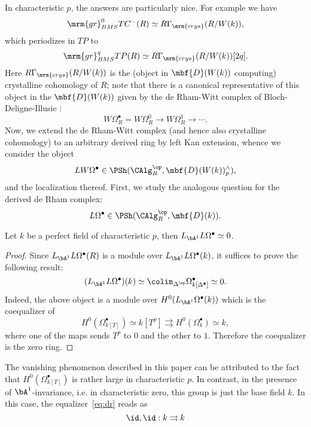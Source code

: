 \documentclass[a4paper,10pt]{amsart}
\begin{document}
\sssec{} In characteristic $p$, the answers are particularly nice. For example we have \cite[Theorems 1.10, 1.12]{BMS2}
\[
\mrm{gr}^0_{BMS}TC^-(R) \simeq R\Gamma_{\mrm{crys}}(R/W(k)),
\]
which periodizes in $TP$ to
\begin{equation} \label{eq:tp-gr}
\mrm{gr}^q_{BMS}TP(R) \simeq R\Gamma_{\mrm{crys}}(R/W(k))[2q].
\end{equation}
Here $R\Gamma_{\mrm{crys}}(R/W(k))$ is the (object in $\mbf{D}(W(k))$ computing) crystalline cohomology of $R$; note that there is a canonical representative of this object in the $\mbf{D}(W(k))$ given by the de Rham-Witt complex of Bloch-Deligne-Illusie \cite{illusie-drw}:
\[
W\Omega^{\bullet}_R = W\Omega^0_R \rightarrow W\Omega^1_R \rightarrow \cdots.
\]
Now, we extend the de Rham-Witt complex (and hence also crystalline cohomology) to an arbitrary derived ring by left Kan extension, whence we consider the object
\[
LW\Omega^{\bullet} \in \PSh(\CAlg_R^{\op},\mbf{D}(W(k))_p^\comp),
\]
and the localization thereof. First, we study the analogous question for the derived de Rham complex:
\[
L\Omega^{\bullet} \in \PSh(\CAlg_R^{\op},\mbf{D}(k)).
\]


\begin{lem} \label{lem:contractible} Let $k$ be a perfect field of characteristic $p$, then $L_{\bA^1}L\Omega^{\bullet} \simeq 0$.
\end{lem}

\begin{proof} Since $L_{\bA^1}L\Omega^{\bullet}(R)$ is a module over $L_{\bA^1}L\Omega^{\bullet}(k)$, it suffices to prove the following result:
\[
(L_{\bA^1}L\Omega^{\bullet})(k) \simeq \colim_{\Delta^{\op}} \Omega^{\bullet}_{k[\Delta^{\bullet}]} \simeq 0.
\]
Indeed, the above object is a module over $H^0(L_{\bA^1}\Omega^{\bullet}(k))$ which is the coequalizer of
\begin{equation} \label{eq:dr}
H^0(\Omega^{\bullet}_{k[T]}) \simeq k[T^p] \rightrightarrows H^0(\Omega^{\bullet}_{k}) \simeq k,
\end{equation}
where one of the maps sends $T^p$ to $0$ and the other to $1$. Therefore the coequalizer is the zero ring.
\end{proof}

\begin{rem} \label{rem:char0} The vanishing phenomenon described in this paper can be attributed to the fact that $H^0(\Omega^{\bullet}_{k[T]})$ is rather large in characteristic $p$. In contrast, in the presence of $\bA^1$-invariance, i.e. in characteristic zero, this group is just the base field $k$. In this case, the equalizer~\eqref{eq:dr} reads as
\[
\id,\id: k \rightrightarrows k
\]
\end{rem}
\end{document}
